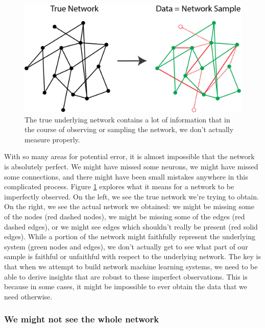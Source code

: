 \begin{figure}[h]
    \centering
    \includegraphics[width=0.7\linewidth]{foundations/ch1/Images/errorful_obs.png}
    \caption[Errorfully observe networks]{The true underlying network contains a lot of information that in the
course of observing or sampling the network, we don't actually measure properly. }
    \label{fig:ch1:errorful_net}
\end{figure}

With so many areas for potential error, it is almost impossible that the network is absolutely perfect. We might have missed some neurons, we might have missed some connections, and there might have been small mistakes anywhere in this complicated process. Figure \ref{fig:ch1:errorful_net} explores what it means for a network to be imperfectly observed. On the left, we see the true network we're trying to obtain. On the right, we see the actual network we obtained: we might be missing some of the nodes (red dashed nodes), we might be missing some of the edges (red dashed edges), or we might see edges which shouldn't really be present (red solid edges). While a portion of the network might faithfully represent the underlying system (green nodes and edges), we don't actually get to see what part of our sample is faithful or unfaithful with respect to the underlying network. The key is that when we attempt to build network machine learning systems, we need to be able to derive insights that are robust to these imperfect observations. This is because in some cases, it might be impossible to ever obtain the data that we need otherwise.

\subsubsection{We might not see the whole network}

